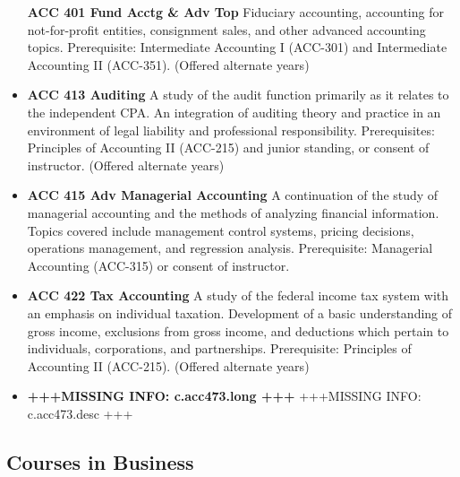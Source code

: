 \documentclass[
  letterpaper,
]{scrbook}
\begin{document}
\begin{itemize}
  \textbf{ACC 401 Fund Acctg \& Adv Top} Fiduciary accounting,
  accounting for not-for-profit entities, consignment sales, and other
  advanced accounting topics. Prerequisite: Intermediate Accounting I
  (ACC-301) and Intermediate Accounting II (ACC-351). (Offered alternate
  years)
\item
  \textbf{ACC 413 Auditing} A study of the audit function primarily as
  it relates to the independent CPA. An integration of auditing theory
  and practice in an environment of legal liability and professional
  responsibility. Prerequisites: Principles of Accounting II (ACC-215)
  and junior standing, or consent of instructor. (Offered alternate
  years)
\item
  \textbf{ACC 415 Adv Managerial Accounting} A continuation of the study
  of managerial accounting and the methods of analyzing financial
  information. Topics covered include management control systems,
  pricing decisions, operations management, and regression analysis.
  Prerequisite: Managerial Accounting (ACC-315) or consent of
  instructor.
\item
  \textbf{ACC 422 Tax Accounting} A study of the federal income tax
  system with an emphasis on individual taxation. Development of a basic
  understanding of gross income, exclusions from gross income, and
  deductions which pertain to individuals, corporations, and
  partnerships. Prerequisite: Principles of Accounting II (ACC-215).
  (Offered alternate years)
\item
  \textbf{+++MISSING INFO: c.acc473.long +++} +++MISSING INFO:
  c.acc473.desc +++
\end{itemize}

\subsection{Courses in Business}\label{courses-in-business}
\end{document}

